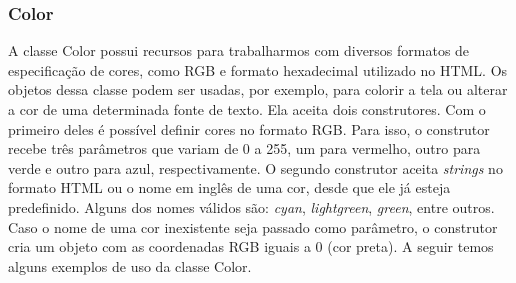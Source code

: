\subsubsection{Color}
%
%
A classe Color possui recursos para trabalharmos com diversos formatos de especificação de cores, como RGB e formato hexadecimal utilizado no HTML. Os objetos dessa classe podem ser usadas, por exemplo, para colorir a tela ou alterar a cor de uma determinada fonte de texto. Ela aceita dois construtores. Com o primeiro deles é possível definir cores no formato RGB. Para isso, o construtor recebe três parâmetros que variam de 0 a 255, um para vermelho, outro para verde e outro para azul, respectivamente. O segundo construtor aceita \textit{strings} no formato HTML ou o nome em inglês de uma cor, desde que ele já esteja predefinido. Alguns dos nomes válidos são: \textit{cyan}, \textit{lightgreen}, \textit{green}, entre outros. Caso o nome de uma cor inexistente seja passado como parâmetro, o construtor cria um objeto com as coordenadas RGB iguais a 0 (cor preta). A seguir temos alguns exemplos de uso da classe Color.
%
%

%
%
